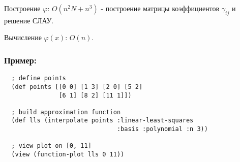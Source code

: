Построение $\varphi$: $ O(n^2N + n^3)$ - построение матрицы коэффициентов $\gamma_{ij}$ и решение СЛАУ.

Вычисление $\varphi(x)$: $O(n)$.

\subsubsection{Пример:}

\begin{verbatim}
  ; define points
  (def points [[0 0] [1 3] [2 0] [5 2]
               [6 1] [8 2] [11 1]])

  ; build approximation function
  (def lls (interpolate points :linear-least-squares
                               :basis :polynomial :n 3))

  ; view plot on [0, 11]
  (view (function-plot lls 0 11))
\end{verbatim}




